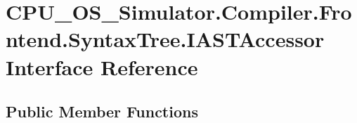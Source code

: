 \hypertarget{interface_c_p_u___o_s___simulator_1_1_compiler_1_1_frontend_1_1_syntax_tree_1_1_i_a_s_t_accessor}{}\section{C\+P\+U\+\_\+\+O\+S\+\_\+\+Simulator.\+Compiler.\+Frontend.\+Syntax\+Tree.\+I\+A\+S\+T\+Accessor Interface Reference}
\label{interface_c_p_u___o_s___simulator_1_1_compiler_1_1_frontend_1_1_syntax_tree_1_1_i_a_s_t_accessor}
\subsection*{Public Member Functions}
